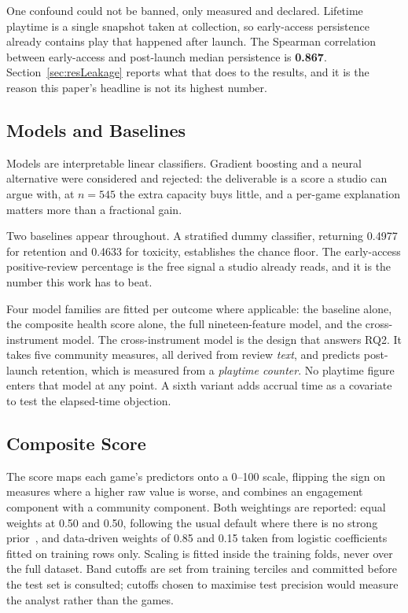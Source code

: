 \documentclass[sigconf]{acmart}
\begin{document}
One confound could not be banned, only measured and declared. Lifetime playtime is a single
snapshot taken at collection, so early-access persistence already contains play that happened after
launch. The Spearman correlation between early-access and post-launch median persistence is
\textbf{0.867}. Section~\ref{sec:resLeakage} reports what that does to the results, and it is the
reason this paper's headline is not its highest number.

\subsection{Models and Baselines}
\label{sec:methodModels}

Models are interpretable linear classifiers. Gradient boosting and a neural alternative were
considered and rejected: the deliverable is a score a studio can argue with, at $n=545$ the extra
capacity buys little, and a per-game explanation matters more than a fractional gain.

Two baselines appear throughout. A stratified dummy classifier, returning 0.4977 for retention and
0.4633 for toxicity, establishes the chance floor. The early-access positive-review percentage is
the free signal a studio already reads, and it is the number this work has to beat.

Four model families are fitted per outcome where applicable: the baseline alone, the composite
health score alone, the full nineteen-feature model, and the cross-instrument model. The
cross-instrument model is the design that answers RQ2. It takes five community measures, all
derived from review \emph{text}, and predicts post-launch retention, which is measured from a
\emph{playtime counter}. No playtime figure enters that model at any point. A sixth variant adds
accrual time as a covariate to test the elapsed-time objection.

\subsection{Composite Score}
\label{sec:methodScore}

The score maps each game's predictors onto a 0--100 scale, flipping the sign on measures where a
higher raw value is worse, and combines an engagement component with a community component. Both
weightings are reported: equal weights at 0.50 and 0.50, following the usual default where there is
no strong prior~\cite{Greco2018}, and data-driven weights of 0.85 and 0.15 taken from logistic
coefficients fitted on training rows only. Scaling is fitted inside the training folds, never over
the full dataset. Band cutoffs are set from training terciles and committed before the test set is
consulted; cutoffs chosen to maximise test precision would measure the analyst rather than the
games.
\end{document}
